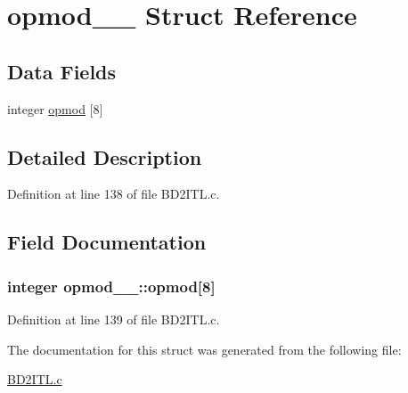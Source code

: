 \hypertarget{structopmod__1__}{}\section{opmod\+\_\+\_\+ Struct Reference}
\label{structopmod__1__}
\subsection*{Data Fields}
\begin{DoxyCompactItemize}
\item 
integer \hyperlink{structopmod__1___a5e463b1ece9726832405599beaa13bb1}{opmod} \mbox{[}8\mbox{]}
\end{DoxyCompactItemize}


\subsection{Detailed Description}


Definition at line 138 of file B\+D2\+I\+T\+L.\+c.



\subsection{Field Documentation}
\subsubsection[{\texorpdfstring{opmod}{opmod}}]{\setlength{\rightskip}{0pt plus 5cm}integer opmod\+\_\+\_\+\+::opmod\mbox{[}8\mbox{]}}\hypertarget{structopmod__1___a5e463b1ece9726832405599beaa13bb1}{}\label{structopmod__1___a5e463b1ece9726832405599beaa13bb1}


Definition at line 139 of file B\+D2\+I\+T\+L.\+c.



The documentation for this struct was generated from the following file\+:\begin{DoxyCompactItemize}
\item 
\hyperlink{BD2ITL_8c}{B\+D2\+I\+T\+L.\+c}\end{DoxyCompactItemize}
